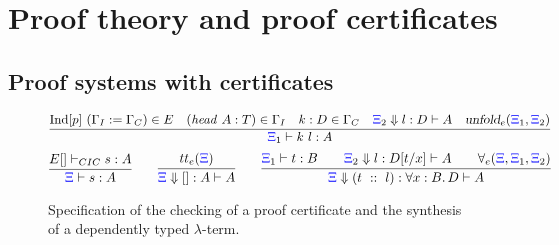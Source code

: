 
\newpage
\section{Proof theory and proof certificates}
\label{sec:three}

\newcommand{\XXi}{{\color{blue}{\Xi}}}
\newcommand{\bc}[5]{#1#2\Downarrow #3 : #4 \vdash #5}


\subsection{Proof systems with certificates}
\label{ssec:focused}




\begin{figure}[t]
\[
\infer{\XXi_1\vdash k\ l : A}
      { \mathrm{Ind}[p] \ (\Gamma_I := \Gamma_C) \in E\quad 
       (\mathit{head} \ A : T)\in \Gamma_I\quad  
       k : D \in \Gamma_C\quad 
       \bc{\XXi_2}{} l D A \quad\unfoldExpert{\XXi_1}{\XXi_2}} 
\]
\vskip -18pt
\[
  \infer{\XXi\vdash  s : A}{{E[] \vdash_{CIC} s : A}}%
  \qquad
  \infer{\bc{\XXi}{}{[]} A A}{\trueExpert{\XXi}}
  \qquad
  \infer{\bc{\XXi}{}{(t\ ::\ l)}{\forall x:B.\, D} A}
        {\XXi_1\vdash t : B\qquad
         \bc{\XXi_2}{}l {D[t/x]} A\qquad
         \prodExpert{\XXi}{\XXi_1}{\XXi_2}}
\]
\caption{Specification of the checking of a proof certificate and the
  synthesis of a dependently typed $\lambda$-term.}
\label{fig:augmented}
\end{figure}

